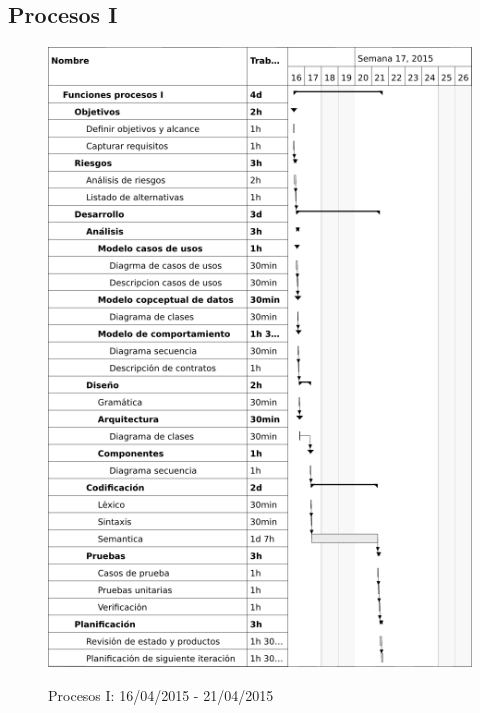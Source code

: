 \subsection{Procesos I}
\begin{center}
\begin{figure}[H]
\centering
\includegraphics[scale=1]{planning/22-funciones-procesos-i.png} \\
\caption{Procesos I: 16/04/2015 - 21/04/2015 }
\end{figure}
\end{center}

